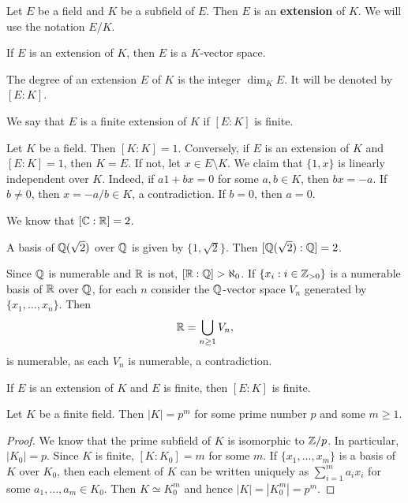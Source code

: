 \begin{definition}
	Let $E$ be a field and $K$ be a subfield of $E$. Then 
	$E$ is an \textbf{extension} of $K$. We will use
	the notation $E/K$. 
\end{definition}

If $E$ is an extension of $K$, then $E$ is a
$K$-vector space. 

\begin{definition}
	The degree of an extension $E$ of $K$ 
	is the integer $\dim_KE$. It will be denoted by $[E:K]$. 
\end{definition}

We say that $E$ is a finite extension of $K$ 
if $[E:K]$ is finite. 

\begin{example}
	Let $K$ be a field. Then $[K:K]=1$. Conversely, 
	if $E$ is an extension of $K$ and $[E:K]=1$, then $K=E$. 
	If not, let $x\in E\setminus K$. We claim that
	$\{1,x\}$ is linearly independent over $K$. Indeed, 
	if $a1+bx=0$ for some $a,b\in K$, then $bx=-a$. If 
	$b\ne 0$, then $x=-a/b\in K$, a contradiction. If $b=0$, then 
	$a=0$. 
\end{example}

We know that $[\mathbb{C}:\mathbb{R}]=2$. 

\begin{example}
	A basis of $\mathbb{Q}(\sqrt{2})$ over $\mathbb{Q}$ 
	is given by $\{1,\sqrt{2}\}$. Then 
	$[\mathbb{Q}(\sqrt{2}):\mathbb{Q}]=2$. 
\end{example}

\begin{example}
	Since $\mathbb{Q}$ is numerable and 
	$\mathbb{R}$ is not, $[\mathbb{R}:\mathbb{Q}]>\aleph_0$. If $\{x_i:i\in\mathbb{Z}_{>0}\}$ 
	is a numerable basis of $\mathbb{R}$ over $\mathbb{Q}$, for each
	$n$ consider the $\mathbb{Q}$-vector space
	$V_n$ generated by $\{x_1,\dots,x_n\}$. Then 
	\[
		\mathbb{R}=\bigcup_{n\geq1}V_n,
	\]
	is numerable, as each $V_n$ is numerable, a contradiction.
\end{example}

If $E$ is an extension of $K$ and $E$ is finite,
then $[E:K]$ is finite. 

\begin{proposition}
	Let $K$ be a finite field. Then $|K|=p^m$ 
	for some prime number $p$ and some $m\geq1$. 
\end{proposition}

\begin{proof}
	We know that the prime subfield of $K$ is isomorphic to $\mathbb{Z}/p$. 
	In particular, $|K_0|=p$. Since $K$ is finite, 
	$[K:K_0]=m$ for some $m$. If $\{x_1,\dots,x_m\}$ is a basis
	of $K$ over $K_0$, then each element
	of $K$ can be written uniquely as
	$\sum_{i=1}^ma_ix_i$ for some $a_1,\dots,a_m\in K_0$. Then
	$K\simeq K_0^m$ and hence $|K|=|K_0^m|=p^m$. 
\end{proof}

